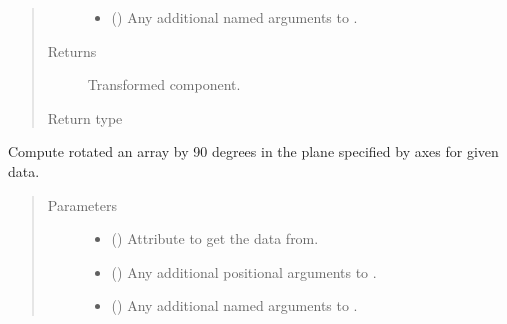 \documentclass[letterpaper,10pt,english]{sphinxmanual}
\begin{document}
\begin{fulllineitems}
\begin{fulllineitems}
\begin{quote}
\begin{description}
\begin{itemize}
\item {} 
 () \textendash{} Any additional named arguments to .

\end{itemize}

\item[{Returns}] \leavevmode
{} \textendash{} Transformed component.

\item[{Return type}] \leavevmode
{\hyperref[\detokenize{api/base_classes:geology.src.base_spatial.SpatialComponent}]{}}

\end{description}\end{quote}

\end{fulllineitems}


\begin{fulllineitems}
\label{\detokenize{api/states:geology.src.States.rot90}}
Compute rotated an array by 90 degrees in the plane specified by axes for given data.
\begin{quote}\begin{description}
\item[{Parameters}] \leavevmode\begin{itemize}
\item {} 
 (\sphinxstyleliteralemphasis{\sphinxupquote{, }}) \textendash{} Attribute to get the data from.

\item {} 
 () \textendash{} Any additional positional arguments to .

\item {} 
 () \textendash{} Any additional named arguments to .


\end{itemize}
\end{description}
\end{quote}
\end{fulllineitems}
\end{fulllineitems}
\end{document}
